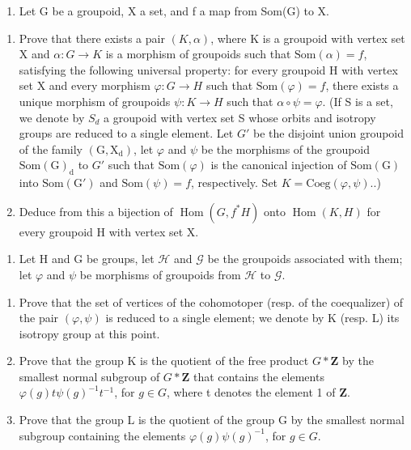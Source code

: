 \setcounter{exercisegroup}{4}

\exercisegroup

\begin{enumerate}
\def\labelenumi{\arabic{enumi})}
\tightlist
\item
  Let G be a groupoid, X a set, and f a map from Som(G) to X.
\end{enumerate}

\begin{enumerate}
\def\labelenumi{\alph{enumi})}
\item
  Prove that there exists a pair \((K,\alpha)\), where K is a groupoid with vertex set X and \(\alpha: G \rightarrow K\) is a morphism of groupoids such that \(\mathrm{Som}(\alpha)=f\), satisfying the following universal property: for every groupoid H with vertex set X and every morphism \(\varphi:G\to H\) such that \(\mathrm{Som}(\varphi)=f\), there exists a unique morphism of groupoids \(\psi:K\to H\) such that \(\alpha\circ\psi=\varphi\). (If S is a set, we denote by \(S_{d}\) a groupoid with vertex set S whose orbits and isotropy groups are reduced to a single element. Let \(G'\) be the disjoint union groupoid of the family \((\mathrm{G},\mathrm{X}_{\mathrm{d}})\), let \(\varphi\) and \(\psi\) be the morphisms of the groupoid \(\mathrm{Som}(\mathrm{G})_{\mathrm{d}}\) to \(G'\) such that \(\mathrm{Som}(\varphi)\) is the canonical injection of \(\mathrm{Som}(\mathrm{G})\) into \(\mathrm{Som}(\mathrm{G}')\) and \(\mathrm{Som}(\psi)=f\), respectively. Set \(K=\mathrm{Coeg}(\varphi,\psi).\).)
\item
  Deduce from this a bijection of \(\operatorname{Hom}(G, f^{*}H)\) onto \(\operatorname{Hom}(K, H)\) for every groupoid H with vertex set X.
\end{enumerate}

\begin{enumerate}
\def\labelenumi{\arabic{enumi})}
\setcounter{enumi}{1}
\tightlist
\item
  Let H and G be groups, let \(\mathcal{H}\) and \(\mathcal{G}\) be the groupoids associated with them; let \(\varphi\) and \(\psi\) be morphisms of groupoids from \(\mathcal{H}\) to \(\mathcal{G}\).
\end{enumerate}

\begin{enumerate}
\def\labelenumi{\alph{enumi})}
\item
  Prove that the set of vertices of the cohomotoper (resp. of the coequalizer) of the pair \((\varphi,\psi)\) is reduced to a single element; we denote by K (resp. L) its isotropy group at this point.
\item
  Prove that the group K is the quotient of the free product \(G * \mathbf{Z}\) by the smallest normal subgroup of \(G * \mathbf{Z}\) that contains the elements \(\varphi(g)t\psi(g)^{-1}t^{-1}\), for \(g \in G\), where t denotes the element 1 of \(\mathbf{Z}\).
\item
  Prove that the group L is the quotient of the group G by the smallest normal subgroup containing the elements \(\varphi(g)\psi(g)^{-1}\), for \(g \in G\).
\end{enumerate}

